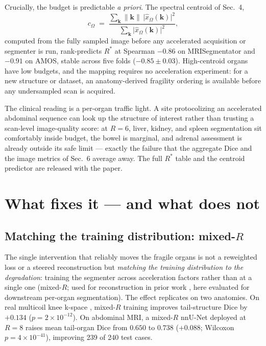 \documentclass[10pt,twocolumn,letterpaper]{article}
\begin{document}
Crucially, the budget is predictable \emph{a priori}. The spectral centroid of Sec.~4,
\begin{equation}
c_\Omega \;=\; \frac{\sum_{\mathbf{k}} \lVert \mathbf{k} \rVert \, \lvert \hat{x}_\Omega(\mathbf{k}) \rvert^{2}}{\sum_{\mathbf{k}} \lvert \hat{x}_\Omega(\mathbf{k}) \rvert^{2}},
\end{equation}
computed from the fully sampled image before any accelerated acquisition or segmenter is run, rank-predicts $R^\ast$ at Spearman $-0.86$ on MRISegmentator and $-0.91$ on AMOS, stable across five folds ($-0.85\pm0.03$). High-centroid organs have low budgets, and the mapping requires no acceleration experiment: for a new structure or dataset, an anatomy-derived fragility ordering is available before any undersampled scan is acquired.

The clinical reading is a per-organ traffic light. A site protocolizing an accelerated abdominal sequence can look up the structure of interest rather than trusting a scan-level image-quality score: at $R=6$, liver, kidney, and spleen segmentation sit comfortably inside budget, the bowel is marginal, and adrenal assessment is already outside its safe limit --- exactly the failure that the aggregate Dice and the image metrics of Sec.~6 average away. The full $R^\ast$ table and the centroid predictor are released with the paper.

\section{What fixes it --- and what does not}
\label{sec:fixes}

\subsection{Matching the training distribution: mixed-$R$}
\label{sec:mixedr}

The single intervention that reliably moves the fragile organs is not a reweighted loss or a steered reconstruction but \emph{matching the training distribution to the degradation}: training the segmenter across acceleration factors rather than at a single one (mixed-$R$; used for reconstruction in prior work \cite{yao2022,razumov2023}, here evaluated for downstream per-organ segmentation). The effect replicates on two anatomies. On real multicoil knee k-space \cite{desai2022skmtea}, mixed-$R$ training improves tail-structure Dice by $+0.134$ ($p=2\times10^{-12}$). On abdominal MRI, a mixed-$R$ nnU-Net \cite{isensee2021} deployed at $R=8$ raises mean tail-organ Dice from $0.650$ to $0.738$ ($+0.088$; Wilcoxon $p=4\times10^{-41}$), improving 239 of 240 test cases.
\end{document}
